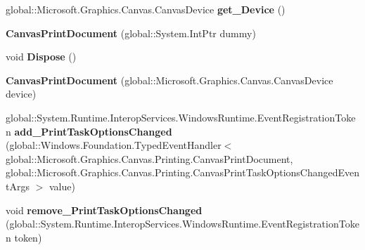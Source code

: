 \begin{DoxyCompactItemize}
\item 
\mbox{\label{class_microsoft_1_1_graphics_1_1_canvas_1_1_printing_1_1_canvas_print_document_ac10aedd8e487c76596dbcc4eb0804aa4}} 
global\+::\+Microsoft.\+Graphics.\+Canvas.\+Canvas\+Device {\bfseries get\+\_\+\+Device} ()
\item 
\mbox{\label{class_microsoft_1_1_graphics_1_1_canvas_1_1_printing_1_1_canvas_print_document_a7b04c2627b88d8910b67203e8ee65b63}} 
{\bfseries Canvas\+Print\+Document} (global\+::\+System.\+Int\+Ptr dummy)
\item 
\mbox{\label{class_microsoft_1_1_graphics_1_1_canvas_1_1_printing_1_1_canvas_print_document_af8d1422f1d9da5b6eb9b656d9bb4144a}} 
void {\bfseries Dispose} ()
\item 
\mbox{\label{class_microsoft_1_1_graphics_1_1_canvas_1_1_printing_1_1_canvas_print_document_a4e0992b6bdb01a46f6b04c52e8c394cb}} 
{\bfseries Canvas\+Print\+Document} (global\+::\+Microsoft.\+Graphics.\+Canvas.\+Canvas\+Device device)
\item 
\mbox{\label{class_microsoft_1_1_graphics_1_1_canvas_1_1_printing_1_1_canvas_print_document_a5820ace78b04e0ce349872d83c3d7006}} 
global\+::\+System.\+Runtime.\+Interop\+Services.\+Windows\+Runtime.\+Event\+Registration\+Token {\bfseries add\+\_\+\+Print\+Task\+Options\+Changed} (global\+::\+Windows.\+Foundation.\+Typed\+Event\+Handler$<$ global\+::\+Microsoft.\+Graphics.\+Canvas.\+Printing.\+Canvas\+Print\+Document, global\+::\+Microsoft.\+Graphics.\+Canvas.\+Printing.\+Canvas\+Print\+Task\+Options\+Changed\+Event\+Args $>$ value)
\item 
\mbox{\label{class_microsoft_1_1_graphics_1_1_canvas_1_1_printing_1_1_canvas_print_document_a0de28697a340eecb4f4b11addd897850}} 
void {\bfseries remove\+\_\+\+Print\+Task\+Options\+Changed} (global\+::\+System.\+Runtime.\+Interop\+Services.\+Windows\+Runtime.\+Event\+Registration\+Token token)

\end{DoxyCompactItemize}
